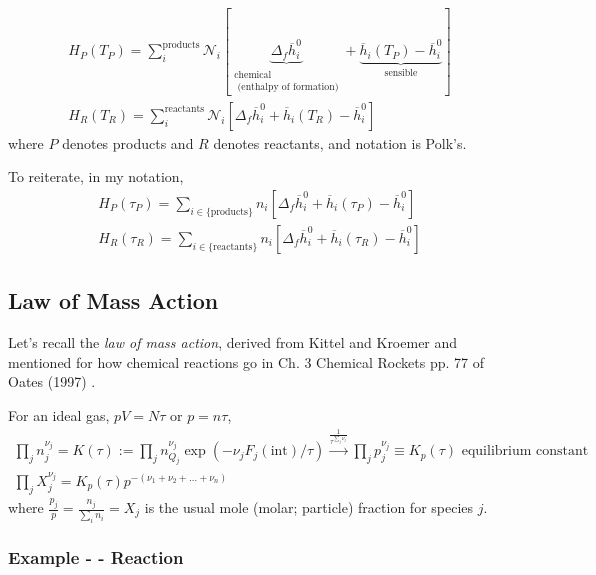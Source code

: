 \documentclass[10pt]{amsart}
\begin{document}
\begin{multicols*}{2}
\[
\begin{gathered}
  H_P(T_P) = \sum_i^{\text{products}} \mathcal{N}_i \left[ \underbrace{ \Delta_f \overline{h}_i^0}_{ \substack{ \text{chemical} \\ \text{  (enthalpy of formation)} } } + \underbrace{\overline{h}_i(T_P)  - \overline{h}_i^0 }_{\text{sensible}} \right] \\
  H_R(T_R) = \sum_i^{\text{reactants}} \mathcal{N}_i \left[ \Delta_f \overline{h}_i^0 + \overline{h}_i(T_R) - \overline{h}_i^0 \right]
\end{gathered}
\]
where $P$ denotes products and $R$ denotes reactants, and notation is Polk's.

To reiterate, in my notation,
\begin{equation}\label{Eq:enthalpyreactantsproducts}
\begin{aligned}
  H_P(\tau_P) = \sum_{i\in \lbrace \text{products}\rbrace } n_i \left[ \Delta_f \overline{h}_i^0 + \overline{h}_i(\tau_P) - \overline{h}_i^0 \right]   \\
  H_R(\tau_R) = \sum_{i\in \lbrace \text{reactants} \rbrace } n_i \left[ \Delta_f \overline{h}_i^0 + \overline{h}_i(\tau_R) - \overline{h}_i^0 \right]
\end{aligned}
\end{equation}

\subsection{Law of Mass Action}

Let's recall the \emph{law of mass action}, derived from Kittel and Kroemer \cite{CKittelHKroemer1980} and mentioned for how chemical reactions go in Ch. 3 Chemical Rockets pp. 77 of Oates (1997) \cite{GOates1997}.  

For an ideal gas, $pV= N\tau$ or $p = n\tau$, 
\begin{equation}
  \begin{gathered}
    \prod_j n_j^{\nu_j} = K(\tau) := \prod_j n_{Q_j}^{\nu_j} \exp{ (-\nu_j F_j(\text{int})/\tau) } \xrightarrow{ \frac{1}{ \tau^{\sum_j \nu _j }} } \prod_j p_j^{\nu_j} \equiv K_p(\tau) \text{ equilibrium constant } \\
      \prod_j X_j^{\nu_j} = K_p(\tau) p^{ -(\nu_1 + \nu_2 + \dots + \nu_n) }
\end{gathered}
\end{equation}
where $\frac{p_j}{p} = \frac{n_j}{ \sum_i n_i} = X_j$ is the usual mole (molar; particle) fraction for species $j$.  
\subsubsection{Example - - Reaction}


\end{multicols*}
\end{document}
